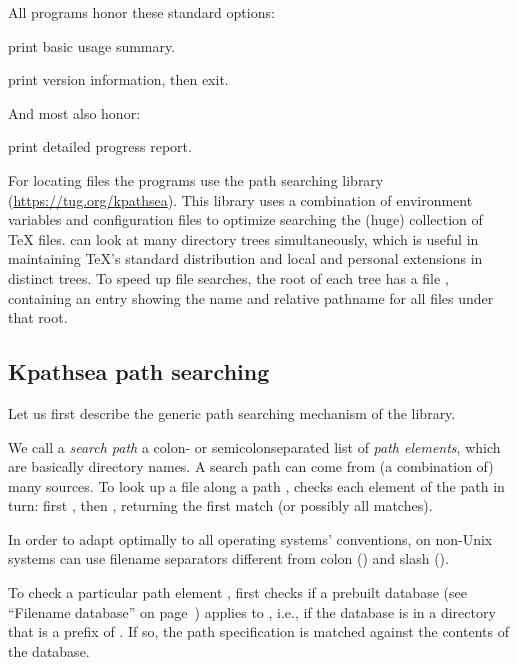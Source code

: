 \documentclass[12pt]{article}
\begin{document}
All programs honor these standard \GNU options:
\begin{ttdescription}
\item[-{}-help] print basic usage summary.
\item[-{}-version] print version information, then exit.
\end{ttdescription}

And most also honor:
\begin{ttdescription}
\item[-{}-verbose] print detailed progress report.
\end{ttdescription}

For locating files the \Webc{} programs use the path searching library
\KPS{} (\url{https://tug.org/kpathsea}).  This library uses a combination
of environment variables and configuration files to optimize searching
the (huge) collection of \TeX{} files.  \Webc{} can look at many
directory trees simultaneously, which is useful in maintaining \TeX's
standard distribution and local and personal extensions in distinct
trees.  To speed up file searches, the root of each tree has a file
, containing an entry showing the name and relative pathname
for all files under that root.


\subsection{Kpathsea path searching}
\label{sec:kpathsea}

Let us first describe the generic path searching mechanism of the \KPS{}
library.

We call a \emph{search path} a colon- or semicolon\hyph sepa\-rated list
of \emph{path elements}, which are basically directory names.  A
search path can come from (a combination of) many sources.  To look up
a file  along a path , \KPS{} checks each
element of the path in turn: first , then
, returning the first match (or possibly all
matches).

In order to adapt optimally to all operating systems' conventions, on
non-Unix systems \KPS{} can use filename separators different from
colon (\samp{:}) and slash (\samp{/}).

To check a particular path element , \KPS{} first checks if a
prebuilt database (see ``Filename data\-base'' on
page~\pageref{sec:filename-database}) applies to , i.e., if the
database is in a directory that is a prefix of .  If so, the path
specification is matched against the contents of the database.
\end{document}
